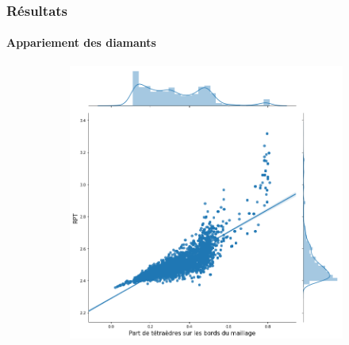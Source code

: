 \documentclass[9pt]{beamer}
\begin{document}
%


\begin{frame}
\small
\frametitle{Résultats}
\framesubtitle{Appariement des diamants}
\small
\begin{figure}[H]
\centering
\begin{subfigure}{.5\textwidth}
  \centering
  \includegraphics[scale=0.18]{Images/boundary_RPT}
  \caption{}
\end{subfigure}%
\begin{subfigure}{.5\textwidth}
  \centering

\end{subfigure}
\end{figure}
\end{frame}
\end{document}
